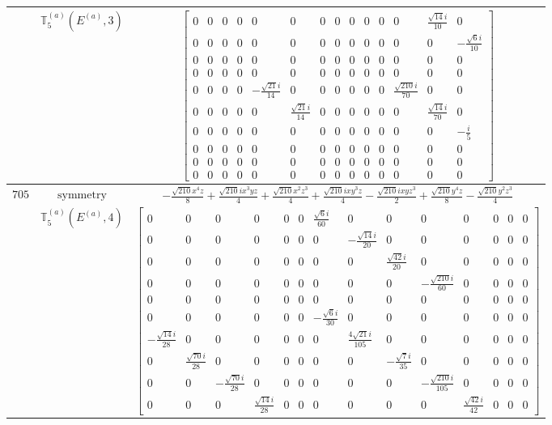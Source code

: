 \documentclass[fleqn,8pt,landscape]{jsarticle}
\begin{document}
\begin{longtable}{ccc}
$  $ & $ \mathbb{T}_{5}^{(a)}(E^{(a)},3) $ & $ \begin{bmatrix} 0 & 0 & 0 & 0 & 0 & 0 & 0 & 0 & 0 & 0 & 0 & 0 & \frac{\sqrt{14} i}{10} & 0 \\ 0 & 0 & 0 & 0 & 0 & 0 & 0 & 0 & 0 & 0 & 0 & 0 & 0 & - \frac{\sqrt{6} i}{10} \\ 0 & 0 & 0 & 0 & 0 & 0 & 0 & 0 & 0 & 0 & 0 & 0 & 0 & 0 \\ 0 & 0 & 0 & 0 & 0 & 0 & 0 & 0 & 0 & 0 & 0 & 0 & 0 & 0 \\ 0 & 0 & 0 & 0 & - \frac{\sqrt{21} i}{14} & 0 & 0 & 0 & 0 & 0 & 0 & \frac{\sqrt{210} i}{70} & 0 & 0 \\ 0 & 0 & 0 & 0 & 0 & \frac{\sqrt{21} i}{14} & 0 & 0 & 0 & 0 & 0 & 0 & \frac{\sqrt{14} i}{70} & 0 \\ 0 & 0 & 0 & 0 & 0 & 0 & 0 & 0 & 0 & 0 & 0 & 0 & 0 & - \frac{i}{5} \\ 0 & 0 & 0 & 0 & 0 & 0 & 0 & 0 & 0 & 0 & 0 & 0 & 0 & 0 \\ 0 & 0 & 0 & 0 & 0 & 0 & 0 & 0 & 0 & 0 & 0 & 0 & 0 & 0 \\ 0 & 0 & 0 & 0 & 0 & 0 & 0 & 0 & 0 & 0 & 0 & 0 & 0 & 0 \end{bmatrix} $ \\ \hline
$ 705 $ & $ \text{symmetry} $ & $ - \frac{\sqrt{210} x^{4} z}{8} + \frac{\sqrt{210} i x^{3} y z}{4} + \frac{\sqrt{210} x^{2} z^{3}}{4} + \frac{\sqrt{210} i x y^{3} z}{4} - \frac{\sqrt{210} i x y z^{3}}{2} + \frac{\sqrt{210} y^{4} z}{8} - \frac{\sqrt{210} y^{2} z^{3}}{4} $ \\
$  $ & $ \mathbb{T}_{5}^{(a)}(E^{(a)},4) $ & $ \begin{bmatrix} 0 & 0 & 0 & 0 & 0 & 0 & \frac{\sqrt{6} i}{60} & 0 & 0 & 0 & 0 & 0 & 0 & 0 \\ 0 & 0 & 0 & 0 & 0 & 0 & 0 & - \frac{\sqrt{14} i}{20} & 0 & 0 & 0 & 0 & 0 & 0 \\ 0 & 0 & 0 & 0 & 0 & 0 & 0 & 0 & \frac{\sqrt{42} i}{20} & 0 & 0 & 0 & 0 & 0 \\ 0 & 0 & 0 & 0 & 0 & 0 & 0 & 0 & 0 & - \frac{\sqrt{210} i}{60} & 0 & 0 & 0 & 0 \\ 0 & 0 & 0 & 0 & 0 & 0 & 0 & 0 & 0 & 0 & 0 & 0 & 0 & 0 \\ 0 & 0 & 0 & 0 & 0 & 0 & - \frac{\sqrt{6} i}{30} & 0 & 0 & 0 & 0 & 0 & 0 & 0 \\ - \frac{\sqrt{14} i}{28} & 0 & 0 & 0 & 0 & 0 & 0 & \frac{4 \sqrt{21} i}{105} & 0 & 0 & 0 & 0 & 0 & 0 \\ 0 & \frac{\sqrt{70} i}{28} & 0 & 0 & 0 & 0 & 0 & 0 & - \frac{\sqrt{7} i}{35} & 0 & 0 & 0 & 0 & 0 \\ 0 & 0 & - \frac{\sqrt{70} i}{28} & 0 & 0 & 0 & 0 & 0 & 0 & - \frac{\sqrt{210} i}{105} & 0 & 0 & 0 & 0 \\ 0 & 0 & 0 & \frac{\sqrt{14} i}{28} & 0 & 0 & 0 & 0 & 0 & 0 & \frac{\sqrt{42} i}{42} & 0 & 0 & 0 \end{bmatrix} $ \\ \hline

\end{longtable}
\end{document}
